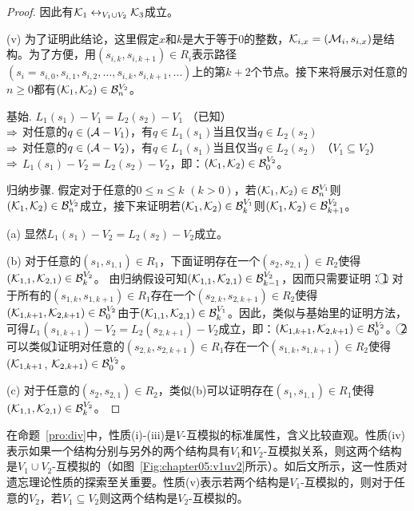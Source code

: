 \begin{proof}
	因此有${\cal K}_1 \leftrightarrow_{V_1 \cup V_2} {\cal K}_3$成立。
	
	(v) 为了证明此结论，这里假定$x$和$k$是大于等于$0$的整数，${\cal K}_{i,x}=({\cal M}_i, s_{i,x})$是结构。为了方便，用$(s_{i,k},s_{i,k+1})\in R_i$表示路径$(s_i=s_{i,0},s_{i,1}, s_{i,2}, \dots, s_{i,k}, s_{i,k+1},\dots)$上的第$k+2$个节点。接下来将展示对任意的$n\ge 0$都有$({\cal K}_1,{\cal K}_2)\in {\cal B}_n^{V_2}$。
	
	基始. $L_1(s_1)-V_1 = L_2(s_2)-V_1$ \hfill（已知）\\
	$\Rightarrow$ 对任意的$q\in ({\cal A}-V_1)$，有$q\in L_1(s_1)$当且仅当$q\in L_2(s_2)$\\
	$\Rightarrow$ 对任意的$q\in ({\cal A}-V_2)$，有$q\in L_1(s_1)$当且仅当$q\in L_2(s_2)$ \hfill （$V_1 \subseteq V_2$）\\
	$\Rightarrow$ $L_1(s_1)-V_2 = L_2(s_2)-V_2$，即：$({\cal K}_1, {\cal K}_2)\in {\cal B}_0^{V_2}$。
	
	归纳步骤. 假定对于任意的$0\leq n \leq k$ $(k > 0)$，若$({\cal K}_1, {\cal K}_2)\in {\cal B}_n^{V_1}$则$({\cal K}_1, {\cal K}_2)\in {\cal B}_n^{V_2}$成立，接下来证明若$({\cal K}_1, {\cal K}_2)\in {\cal B}_k^{V_1}$则$({\cal K}_1, {\cal K}_2)\in {\cal B}_{k+1}^{V_2}$。
	
	(a) 显然$L_1(s_1)-V_2 = L_2(s_2)-V_2$成立。
	
	(b) 对于任意的$(s_1,s_{1,1})\in R_1$，下面证明存在一个$(s_2,s_{2,1})\in R_2$使得$({\cal K}_{1,1}, {\cal K}_{2,1}) \in {\cal B}_k^{V_2}$。
	由归纳假设可知$({\cal K}_{1,1}, {\cal K}_{2,1}) \in {\cal B}_{k-1}^{V_2}$，因而只需要证明：\textcircled{1} 对于所有的$(s_{1,k},s_{1,k+1})\in R_1$存在一个$(s_{2,k},s_{2,k+1})\in R_2$使得$({\cal K}_{1,k+1}, {\cal K}_{2,k+1}) \in {\cal B}_0^{V_2}$由于$({\cal K}_{1,1}, {\cal K}_{2,1}) \in {\cal B}_k^{V_1}$。因此，类似与基始里的证明方法，可得$L_1(s_{1,k+1})-V_2 = L_2(s_{2,k+1})-V_2$成立，即：$({\cal K}_{1,k+1}, {\cal K}_{2,k+1}) \in {\cal B}_0^{V_2}$。
	\textcircled{2} 可以类似\textcircled{1}证明对任意的$(s_{2,k},s_{2,k+1})\in R_1$存在一个$(s_{1,k},s_{1,k+1})\in R_2$使得$({\cal K}_{1,k+1}$, ${\cal K}_{2,k+1}) \in {\cal B}_0^{V_2}$。
	
	(c) 对于任意的$(s_2,s_{2,1}) \in R_2$，类似(b)可以证明存在$(s_1,s_{1,1}) \in R_1$使得$({\cal K}_{1,1}, {\cal K}_{2,1}) \in {\cal B}_k^{V_2}$。
\end{proof}
 
 在命题~\ref{pro:div}中，性质(i)-(iii)是$V$-互模拟的标准属性，含义比较直观。性质(iv)表示如果一个结构分别与另外的两个结构具有$V_1$和$V_2$-互模拟关系，则这两个结构是$V_1\cup V_2$-互模拟的（如图~\ref{Fig:chapter05:v1uv2}所示）。如后文所示，这一性质对遗忘理论性质的探索至关重要。性质(v)表示若两个结构是$V_1$-互模拟的，则对于任意的$V_2$，若$V_1 \subseteq V_2$则这两个结构是$V_2$-互模拟的。
 
